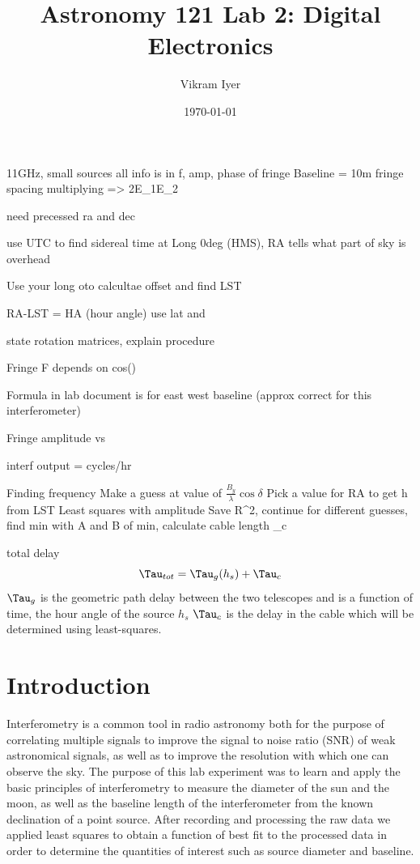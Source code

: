 \documentclass{article}
\title{Astronomy 121 Lab 2: Digital Electronics}
\author{Vikram Iyer}
\date{\today}
\begin{document}
\maketitle


\begin{abstract}
\end{abstract}


11GHz, small sources
all info is in f, amp, phase of fringe
Baseline = 10m
fringe spacing 
multiplying => 2E_1E_2

need precessed ra and dec

use UTC to find sidereal time at Long 0deg (HMS), RA tells what part of sky is
overhead

Use your long oto calcultae offset and find LST

RA-LST = HA (hour angle)
use lat and

state rotation matrices, explain procedure

Fringe F depends on  cos(\delta)

Formula in lab document is for east west baseline (approx correct for this
interferometer)

Fringe amplitude vs

interf output = cycles/hr

Finding frequency
Make a guess at value of $\frac{B_y}{\lambda}\cos \delta$
Pick a value for RA to get h from LST
Least squares with amplitude
Save R^2, continue for different guesses, find min
with A and B of min, calculate cable length \tau_c

total delay
$$\Tau_{tot}=\Tau_{g}(h_s)+\Tau_c$$
$\Tau_g$ is the geometric path delay between the two telescopes and is a
function of time, the hour angle of the source $h_s$
$\Tau_c$ is the delay in the cable which will be determined using least-squares.


\section{Introduction}
Interferometry is a common tool in radio astronomy both for the purpose of
correlating multiple signals to improve the signal to noise ratio (SNR)
of weak astronomical signals, as well as to improve the resolution with which
one can observe the sky. The purpose of this lab experiment was to learn and
apply the basic principles of interferometry to measure the diameter of the sun
and the moon, as well as the baseline length of the interferometer from the
known declination of a point source. After recording and processing the raw data
we applied least squares to obtain a function of best fit to the processed data in order to determine the quantities of interest such as source diameter and
baseline.
\end{document}
